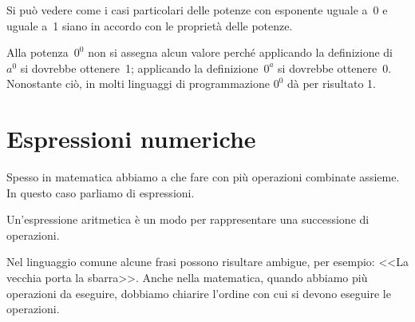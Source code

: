 \bigskip %

Si può vedere come i casi particolari delle potenze con esponente uguale a~0 
e uguale a~1 siano in accordo con le proprietà delle potenze.

\vspace{-1.5em}

\begin{osservazione}{}{} 
Alla potenza~\(0^0\) non si assegna alcun valore perché applicando la 
definizione di~\(a^0\) si dovrebbe ottenere~1;
applicando la definizione~\(0^a\) si dovrebbe ottenere~0. Nonostante ciò, in 
molti linguaggi di programmazione \(0^0\) dà per risultato 1.
\end{osservazione}


\section{Espressioni numeriche}
\label{sec:nat_espressioni}

Spesso in matematica abbiamo a che fare con più operazioni combinate 
assieme.
In questo caso parliamo di espressioni.

\begin{definizione}{}{}
Un'espressione aritmetica è un modo per rappresentare una successione 
di operazioni.
\end{definizione}

Nel linguaggio comune alcune frasi possono risultare ambigue, per esempio:
<<La vecchia porta la sbarra>>. 
Anche nella matematica, quando abbiamo più operazioni da eseguire, dobbiamo 
chiarire l'ordine con cui si devono eseguire le operazioni. 

